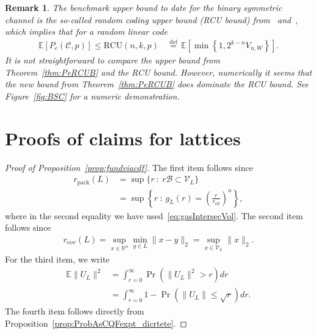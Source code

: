 \documentclass[article,doublecolumn]{IEEEtran}
\newcommand{\EE}{{\mathbb{E}}}
\newcommand{\df}{{\, \stackrel{\mathrm{def}}{=}\, }}
\newcommand{\R}{{\mathbb{R}}}
\newcommand{\CC}{{\mathcal{C}}}
\newcommand{\mVL}{{\mathcal{V}_L}}
\newcommand{\mBeuc}{{\mathcal{B}}}
\newcommand{\rpack}{{r_{\mathrm{pack}}}}
\newcommand{\rcov}{{r_{\mathrm{cov}}}}
\newcommand{\reff}{{r_{\mathrm{eff}}}}
\newcommand{\VcdfL}{g_L}
\newtheorem{remark}[thm]{Remark}
\begin{document}
\begin{remark}
The benchmark upper bound to date for the binary symmetric channel is the so-called random coding upper bound (RCU bound) from~\cite{poltyrev94} and~\cite[Theorem 33]{ppv10}, which implies that for a random linear code
\begin{align}
\EE[P_e(\CC,p)]\leq \mathrm{RCU}(n,k,p)&\df\EE\left[\min\left\{1,2^{k-n}V_{n,W}\right\} \right].
\end{align}
It is not straightforward to compare the upper bound from Theorem~\ref{thm:PeRCUB} and the RCU bound. However, numerically it seems that the new bound from Theorem~\ref{thm:PeRCUB} does dominate the RCU bound. See Figure~\ref{fig:BSC} for a numeric demonstration.
\end{remark}



\appendices

\section{Proofs of claims for lattices}
\label{app:contCDFproperties}

\begin{proof}[Proof of Proposition~\ref{prop:fundviacdf}]
The first item follows since 
\begin{align}
\rpack(L)&=\sup\{r~:~r\mBeuc\subset\mVL\}\\
&=\sup\left\{r~:~\VcdfL(r)=\left(\frac{r}{\reff}\right)^n\right\},
\end{align}
where in the second equality we have used~\eqref{eq:gasIntersecVol}. The second item follows since
\begin{align}
\rcov(L)=\sup_{x\in\R^n}\min_{y\in L} \|x-y\|_2=\sup_{x\in \mVL}\|x\|_2.   
\end{align}
For the third item, we write
\begin{align}
\EE\|U_L\|^2&=\int_{r=0}^\infty \Pr(\|U_L\|^2> r)dr\\
&= \int_{r=0}^\infty 1-\Pr(\|U_L\|\leq \sqrt{r})dr.   
\end{align}
The fourth item follows directly from Proposition~\ref{prop:ProbAsCQFexpt_dicrtete}.
\end{proof}
\end{document}
